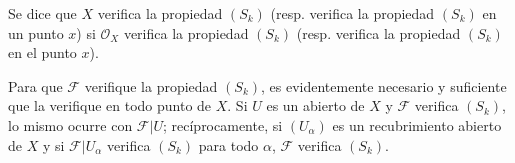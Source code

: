 Se dice que $X$ verifica la propiedad $(S_k)$ (resp. verifica la propiedad
$(S_k)$ en un punto $x$) si $\mathcal O_X$ verifica la propiedad $(S_k)$
(resp. verifica la propiedad $(S_k)$ en el punto $x$).

Para que $\mathscr F$ verifique la propiedad $(S_k)$, es evidentemente
necesario y suficiente que la verifique en todo punto de $X$. Si $U$ es un
abierto de $X$ y $\mathscr F$ verifica $(S_k)$, lo mismo ocurre con
$\mathscr F|U$; recíprocamente, si $(U_\alpha)$ es un recubrimiento abierto
de $X$ y si $\mathscr F|U_\alpha$ verifica $(S_k)$ para todo $\alpha$,
$\mathscr F$ verifica $(S_k)$.
